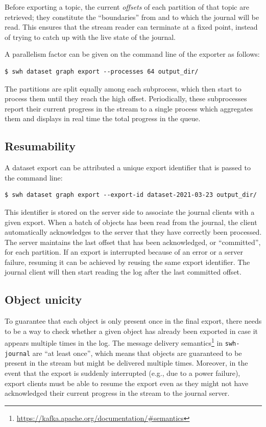 Before exporting a topic, the current \emph{offsets} of each partition of that
topic are retrieved; they constitute the ``boundaries'' from and to which the
journal will be read. This ensures that the stream reader can terminate at a
fixed point, instead of trying to catch up with the live state of the journal.

A parallelism factor can be given on the command line of the exporter as
follows:

\begin{verbatim}
$ swh dataset graph export --processes 64 output_dir/
\end{verbatim}

The partitions are split equally among each subprocess, which then start to
process them until they reach the high offset. Periodically, these subprocesses
report their current progress in the stream to a single process which
aggregates them and displays in real time the total progress in the queue.

\subsection{Resumability}

A dataset export can be attributed a unique export identifier that is passed
to the command line:

\begin{verbatim}
$ swh dataset graph export --export-id dataset-2021-03-23 output_dir/
\end{verbatim}

This identifier is stored on the server side to associate the journal clients
with a given export.
When a batch of objects has been read from the journal, the client
automatically acknowledges to the server that they have correctly been
processed. The server maintains the last offset that has been acknowledged, or
``committed'', for each partition.
If an export is interrupted because of an error or a server failure, resuming
it can be achieved by reusing the same export identifier. The journal client
will then start reading the log after the last committed offset.

\subsection{Object unicity}
\label{sec:dataset-export-unicity}

To guarantee that each object is only present once in the final export, there
needs to be a way to check whether a given object has already been exported in
case it appears multiple times in the log. The message delivery
semantics\footnote{\url{https://kafka.apache.org/documentation/\#semantics}} in
\texttt{swh-journal} are ``at least once'', which means that objects are
guaranteed to be present in the stream but might be delivered multiple times.
Moreover, in the event that the export is suddenly interrupted (e.g., due to a
power failure), export clients must be able to resume the export even as they
might not have acknowledged their current progress in the stream to the journal
server.

